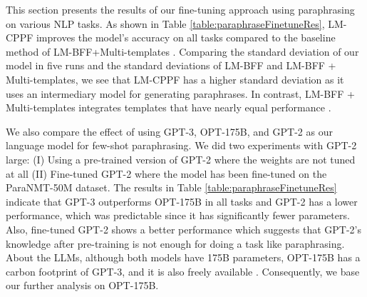 \documentclass[11pt]{article}
\begin{document}
This section presents the results of our fine-tuning approach using paraphrasing on various NLP tasks. As shown in Table \ref{table:paraphraseFinetuneRes}, LM-CPPF improves the model's accuracy on all tasks compared to the baseline method of LM-BFF+Multi-templates \cite{jian-etal-2022-contrastive}. Comparing the standard deviation of our model in five runs and the standard deviations of LM-BFF and LM-BFF + Multi-templates, we see that LM-CPPF has a higher standard deviation as it uses an intermediary model for generating paraphrases. In contrast, LM-BFF + Multi-templates integrates templates that have nearly equal performance \cite{jian-etal-2022-contrastive}.

We also compare the effect of using GPT-3, OPT-175B, and GPT-2 as our language model for few-shot paraphrasing. We did two experiments with GPT-2 large: (I) Using a pre-trained version of GPT-2 where the weights are not tuned at all (II) Fine-tuned GPT-2 where the model has been fine-tuned on the ParaNMT-50M dataset. The results in Table \ref{table:paraphraseFinetuneRes} indicate that GPT-3 outperforms OPT-175B in all tasks and GPT-2 has a lower performance, which was predictable since it has significantly fewer parameters. Also, fine-tuned GPT-2 shows a better performance which suggests that GPT-2's knowledge after pre-training is not enough for doing a task like paraphrasing. About the LLMs, although both models have 175B parameters, OPT-175B has a  carbon footprint of GPT-3, and it is also freely available \cite{zhang2022opt}. Consequently, we base our further analysis on OPT-175B.
\end{document}
